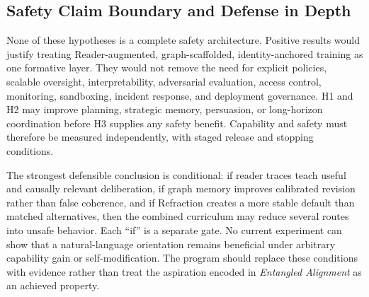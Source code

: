 \subsection{Safety Claim Boundary and Defense in Depth}

None of these hypotheses is a complete safety architecture. Positive results
would justify treating Reader-augmented, graph-scaffolded, identity-anchored
training as one formative layer. They would not remove the need for explicit
policies, scalable oversight, interpretability, adversarial evaluation, access
control, monitoring, sandboxing, incident response, and deployment governance.
H1 and H2 may improve planning, strategic memory, persuasion, or long-horizon
coordination before H3 supplies any safety benefit. Capability and safety must
therefore be measured independently, with staged release and stopping
conditions.

The strongest defensible conclusion is conditional: if reader traces teach
useful and causally relevant deliberation, if graph memory improves calibrated
revision rather than false coherence, and if Refraction creates a more stable
default than matched alternatives, then the combined curriculum may reduce
several routes into unsafe behavior. Each ``if'' is a separate gate. No current
experiment can show that a natural-language orientation remains beneficial
under arbitrary capability gain or self-modification. The program should
replace these conditions with evidence rather than treat the aspiration encoded
in \emph{Entangled Alignment} as an achieved property.

